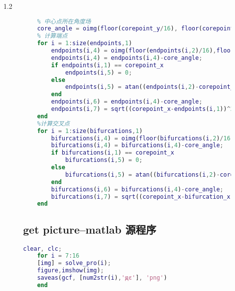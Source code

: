 \documentclass{whutmod}
\begin{document}
\begin{spacing}{1.2}
\begin{figure}[H]
\begin{lstlisting}[language=matlab]
	%% 计算方向场角度差
	% 中心点所在角度场
	core_angle = oimg(floor(corepoint_y/16), floor(corepoint_x/16));
	% 计算端点
	for i = 1:size(endpoints,1)
		endpoints(i,4) = oimg(floor(endpoints(i,2)/16),floor(endpoints(i,1)/16));
		endpoints(i,4) = endpoints(i,4)-core_angle;
		if endpoints(i,1) == corepoint_x
			endpoints(i,5) = 0;
		else
			endpoints(i,5) = atan((endpoints(i,2)-corepoint_y)/(endpoints(i,1)-corepoint_x))-core_angle;
		end
		endpoints(i,6) = endpoints(i,4)-core_angle;
		endpoints(i,7) = sqrt((corepoint_x-endpoints(i,1))^2+(corepoint_y-endpoints(i,2))^2);
	end
	%计算交叉点
	for i = 1:size(bifurcations,1)
		bifurcations(i,4) = oimg(floor(bifurcations(i,2)/16),floor(bifurcations(i,1)/16));
		bifurcations(i,4) = bifurcations(i,4)-core_angle;
		if bifurcations(i,1) == corepoint_x
			bifurcations(i,5) = 0;
		else
			bifurcations(i,5) = atan((bifurcations(i,2)-corepoint_y)/(bifurcations(i,1)-corepoint_x))-core_angle;
		end
		bifurcations(i,6) = bifurcations(i,4)-core_angle;
		bifurcations(i,7) = sqrt((corepoint_x-bifurcation_x(i))^2+(corepoint_y-bifurcation_y(i))^2);
	end
\end{lstlisting}


\subsection{get picture--matlab 源程序}
\begin{lstlisting}[language=matlab]
	clear, clc;
	for i = 7:16
	[img] = solve_pro(i);
	figure,imshow(img);
	saveas(gcf, [num2str(i),'ԭͼ'], 'png')
	end
\end{lstlisting}



\end{figure}
\end{spacing}
\end{document}
